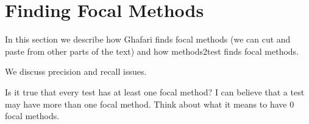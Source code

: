 \section{Finding Focal Methods}
\label{sec:focal}

In this section we describe how Ghafari finds focal methods (we can cut and paste from other parts of the text) and how methods2test finds focal methods.

We discuss precision and recall issues.

Is it true that every test has at least one focal method? I can believe that a test may have more than one focal method. Think about what it means to have 0 focal methods.
